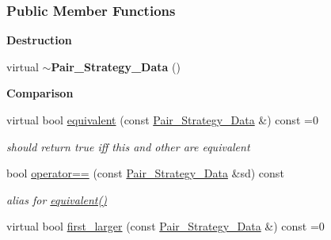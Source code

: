\subsubsection*{Public Member Functions}
\begin{Indent}\textbf{ Destruction}\par
\begin{DoxyCompactItemize}
\item 
\mbox{\label{group__strategygroup_a177d4749902d7c94d8e48340a64d87b7}} 
virtual {\bfseries $\sim$\+Pair\+\_\+\+Strategy\+\_\+\+Data} ()
\end{DoxyCompactItemize}
\end{Indent}
\begin{Indent}\textbf{ Comparison}\par
\begin{DoxyCompactItemize}
\item 
\mbox{\label{group__strategygroup_ae29822eaf584f1f9654c4ec821734279}} 
virtual bool \hyperlink{group__strategygroup_ae29822eaf584f1f9654c4ec821734279}{equivalent} (const \hyperlink{group__strategygroup_class_pair___strategy___data}{Pair\+\_\+\+Strategy\+\_\+\+Data} \&) const =0
\begin{DoxyCompactList}\small\item\em should return {\ttfamily true} iff {\ttfamily this} and other are equivalent \end{DoxyCompactList}\item 
\mbox{\label{group__strategygroup_a41f03829d564520427fb9405aefe41be}} 
bool \hyperlink{group__strategygroup_a41f03829d564520427fb9405aefe41be}{operator==} (const \hyperlink{group__strategygroup_class_pair___strategy___data}{Pair\+\_\+\+Strategy\+\_\+\+Data} \&sd) const
\begin{DoxyCompactList}\small\item\em alias for \hyperlink{group__strategygroup_ae29822eaf584f1f9654c4ec821734279}{equivalent()} \end{DoxyCompactList}\item 
\mbox{\label{group__strategygroup_a272edeb1893af886b4449d7bcb799cdb}} 
virtual bool \hyperlink{group__strategygroup_a272edeb1893af886b4449d7bcb799cdb}{first\+\_\+larger} (const \hyperlink{group__strategygroup_class_pair___strategy___data}{Pair\+\_\+\+Strategy\+\_\+\+Data} \&) const =0

\end{DoxyCompactItemize}
\end{Indent}
